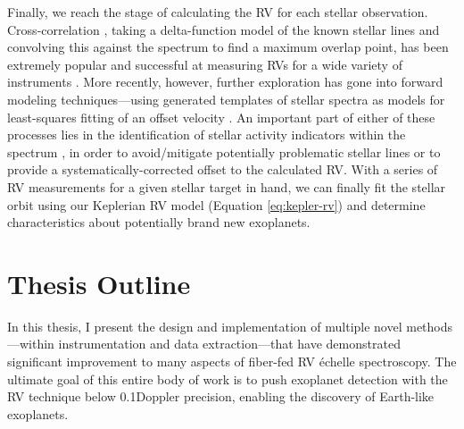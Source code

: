 Finally, we reach the stage of calculating the RV for each stellar observation. Cross-correlation \citep{baranne_coravel_1979}, taking a delta-function model of the known stellar lines and convolving this against the spectrum to find a maximum overlap point, has been extremely popular and successful at measuring RVs for a wide variety of instruments \citep[e.g.][]{freudling_automated_2013, brahm_ceres_2017, modigliani_espresso_2019}. More recently, however, further exploration has gone into forward modeling techniques---using generated templates of stellar spectra as models for least-squares fitting of an offset velocity \citep[e.g.][]{zechmeister_spectrum_2018, rajpaul_robust_2020}. An important part of either of these processes lies in the identification of stellar activity indicators within the spectrum \citep[e.g.][]{davis_insights_2017, dumusque_measuring_2018}, in order to avoid/mitigate potentially problematic stellar lines or to provide a systematically-corrected offset to the calculated RV. With a series of RV measurements for a given stellar target in hand, we can finally fit the stellar orbit using our Keplerian RV model (Equation \ref{eq:kepler-rv}) and determine characteristics about potentially brand new exoplanets.

\section{Thesis Outline} \label{intro:structure}

In this thesis, I present the design and implementation of multiple novel methods---within instrumentation and data extraction---that have demonstrated significant improvement to many aspects of fiber-fed RV \'echelle spectroscopy. The ultimate goal of this entire body of work is to push exoplanet detection with the RV technique below 0.1\ms Doppler precision, enabling the discovery of Earth-like exoplanets.

